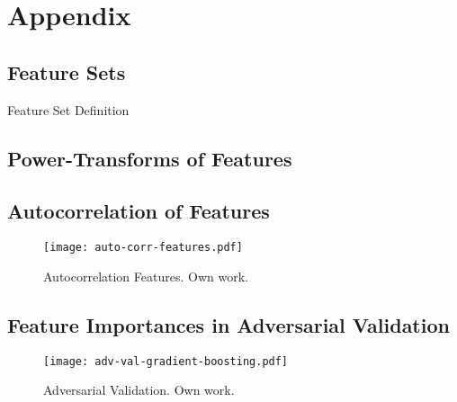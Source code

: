 \section{Appendix}


\subsection{Feature Sets}
\label{app:feature-sets}

\begin{table}[H]
    \centering
    
    \caption[Feature Set Definition]{Feature Set Definition}
    \label{tab:feature-set-definition}
\end{table}

\newpage

\newpage
\subsection{Power-Transforms of Features}
\label{app:power-transforms-of-features}

\newpage
\subsection{Autocorrelation of Features}
\label{app:autocorrelation-of-features}

\begin{figure}[ht]
    \centering
    \texttt{[image: auto-corr-features.pdf]}
    \caption[Autocorrelation Features]{Autocorrelation Features. Own work.}
    \label{fig:auto-correlation-features}
\end{figure}

\newpage
\subsection{Feature Importances in Adversarial Validation}
\label{app:feature-importances-adv-validation}
\begin{figure}[ht]
    \centering
    \texttt{[image: adv-val-gradient-boosting.pdf]}
    \caption[Adversarial Validation]{Adversarial Validation. Own work.}
    \label{fig:adv-validation}
\end{figure}
